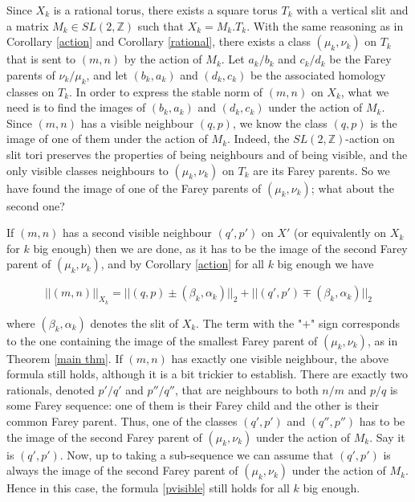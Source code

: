 \documentclass{article}
\newcommand{\ZZ}{\mathbb{Z}}
\theoremstyle{definition}
\begin{document}
Since $X_k$ is a rational torus, there exists a square torus $T_k$ with a vertical slit and a matrix $M_k \in SL(2,\ZZ)$ such that $X_k = M_k . T_k$. With the same reasoning as in Corollary \ref{action} and Corollary \ref{rational}, there exists a class $(\mu_k,\nu_k)$ on $T_k$ that is sent to $(m,n)$ by the action of $M_k$. Let $a_k/b_k$ and $c_k/d_k$ be the Farey parents of $\nu_k/\mu_k$, and let $(b_k,a_k)$ and $(d_k,c_k)$ be the associated homology classes on $T_k$. In order to express the stable norm of $(m,n)$ on $X_k$, what we need is to find the images of $(b_k,a_k)$ and $(d_k,c_k)$ under the action of $M_k$. Since $(m,n)$ has a visible neighbour $(q,p)$, we know the class $(q,p)$ is the image of one of them under the action of $M_k$. Indeed, the $SL(2,\ZZ)$-action on slit tori preserves the properties of being neighbours and of being visible, and the only visible classes neighbours to $(\mu_k,\nu_k)$ on $T_k$ are its Farey parents. So we have found the image of one of the Farey parents of $(\mu_k,\nu_k)$; what about the second one? \newline

If $(m,n)$ has a second visible neighbour $(q',p')$ on $X'$ (or equivalently on $X_k$ for $k$ big enough) then we are done, as it has to be the image of the second Farey parent of $(\mu_k,\nu_k)$, and by Corollary \ref{action} for all $k$ big enough we have

\begin{equation} \label{pvisible}  
||(m,n)||_{X_k} = ||(q,p) \pm (\beta_k,\alpha_k)||_2 + || (q',p') \mp (\beta_k,\alpha_k)||_2
\end{equation}

where $(\beta_k,\alpha_k)$ denotes the slit of $X_k$.
The term with the "$+$" sign corresponds to the one containing the image of the smallest Farey parent of $(\mu_k,\nu_k)$, as in Theorem \ref{main thm}. \newline 
 If $(m,n)$ has exactly one visible neighbour, the above formula still holds, although it is a bit trickier to establish. There are exactly two rationals, denoted $p'/q'$ and $p''/q''$, that are neighbours to both $n/m$ and $p/q$ is some Farey sequence: one of them is their Farey child and the other is their common Farey parent. Thus, one of the classes $(q',p')$ and $(q'',p'')$ has to be the image of the second Farey parent of $(\mu_k,\nu_k)$ under the action of $M_k$. Say it is $(q',p')$. Now, up to taking a sub-sequence we can assume that $(q',p')$ is always the image of the second Farey parent of $(\mu_k,\nu_k)$ under the action of $M_k$. Hence in this case, the formula  \ref{pvisible} still holds for all $k$ big enough. \\ 
\end{document}
